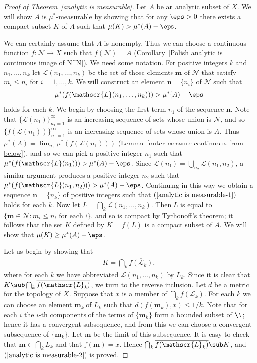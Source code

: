 \begin{proof}[Proof of Theorem~\ref{analytic is measurable}]
Let $A$ be an analytic subset of $X$. We will show $A$ is $\mu^*$-measurable by showing that for any $\eps>0$ there exists a compact subset $K$ of $A$ such that $\mu(K)>\mu^*(A)-\eps$.\par
We can certainly assume that $A$ is nonempty. Thus we can choose a continuous function $f:\mathscr{N}\to X$ such that $f(\mathscr{N})=A$ (Corollary~\ref{Polish analytic is continuous image of N^N}). We need some notation. For positive integers $k$ and $n_1,\dots,n_k$ let $\mathscr{L}(n_1,\dots,n_k)$ be the set of those elements $\mathbf{m}$ of $\mathscr{N}$ that satisfy $m_i\leq n_i$ for $i=1,\dots,k$. We will construct an element $\mathbf{n}=\{n_i\}$ of $\mathscr{N}$ such that
\begin{align}\label{analytic is measurable-1}
\mu^*(f(\mathscr{L}(n_1,\dots,n_k)))>\mu^*(A)-\eps
\end{align}
holds for each $k$. We begin by choosing the first term $n_1$ of the sequence $\mathbf{n}$. Note that $\{\mathscr{L}(n_1)\}_{n_1=1}^{\infty}$ is an increasing sequence of sets whose union is $\mathscr{N}$, and so $\{f(\mathscr{L}(n_1))\}_{n_1=1}^{\infty}$ is an increasing sequence of sets whose union is $A$. Thus $\mu^*(A)=\lim_{n_1}\mu^*(f(\mathscr{L}(n_1)))$ (Lemma~\ref{outer measure continuous from below}), and so we can pick a positive integer $n_1$ such that $\mu^*(f(\mathscr{L}(n_1)))>\mu^*(A)-\eps$. Since $\mathscr{L}(n_1)=\bigcup_{n_2}\mathscr{L}(n_1,n_2)$, a similar argument produces a positive integer $n_2$ such that $\mu^*(f(\mathscr{L}(n_1,n_2)))>\mu^*(A)-\eps$. Continuing in this way we obtain a sequence $\mathbf{n}=\{n_k\}$ of positive integers such that $(\ref{analytic is measurable-1})$ holds for each $k$. Now let $L=\bigcap_k\mathscr{L}(n_1,\dots,n_k)$. Then $L$ is equal to $\{\mathbf{m}\in\mathscr{N}:m_i\leq n_i\text{ for each $i$}\}$, and so is compact by Tychonoff's theorem; it follows that the set $K$ defined by $K=f(L)$ is a compact subset of $A$. We will show that $\mu(K)\geq \mu^*(A)-\eps$.\par
Let us begin by showing that
\begin{align}\label{analytic is measurable-2}
K=\bigcap_k\overline{f(\mathscr{L}_k)},
\end{align}
where for each $k$ we have abbreviated $\mathscr{L}(n_1,\dots,n_k)$ by $L_k$. Since it is clear that $K\sub\bigcap_k\overline{f(\mathscr{L}_k)}$, we turn to the reverse inclusion. Let $d$ be a metric for the topology of $X$. Suppose that $x$ is a member of $\bigcap_k\overline{f(\mathscr{L}_k)}$. For each $k$ we can choose an element $\mathbf{m}_k$ of $L_k$ such that $d(f(\mathbf{m}_k),x)\leq 1/k$. Note that for each $i$ the $i$-th components of the terms of $\{\mathbf{m}_k\}$ form a bounded subset of $\N$; hence it has a convergent subsequence, and from this we can choose a convergent subsequence of $\{\mathbf{m}_k\}$. Let $\mathbf{m}$ be the limit of this subsequence. It is easy to check that $\mathbf{m}\in\bigcap_kL_k$ and that $f(\mathbf{m})=x$. Hence $\bigcap_k\overline{f(\mathscr{L}_k)}\sub K$, and $(\ref{analytic is measurable-2})$ is proved.\par

\end{proof}
